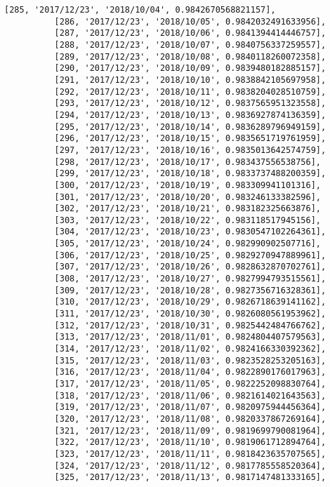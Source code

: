 \documentclass[11pt]{article}
\begin{document}
\begin{Verbatim}[commandchars=\\\{\}]
          [285, '2017/12/23', '2018/10/04', 0.9842670568821157],
          [286, '2017/12/23', '2018/10/05', 0.9842032491633956],
          [287, '2017/12/23', '2018/10/06', 0.9841394414446757],
          [288, '2017/12/23', '2018/10/07', 0.9840756337259557],
          [289, '2017/12/23', '2018/10/08', 0.9840118260072358],
          [290, '2017/12/23', '2018/10/09', 0.9839480182885157],
          [291, '2017/12/23', '2018/10/10', 0.9838842105697958],
          [292, '2017/12/23', '2018/10/11', 0.9838204028510759],
          [293, '2017/12/23', '2018/10/12', 0.9837565951323558],
          [294, '2017/12/23', '2018/10/13', 0.9836927874136359],
          [295, '2017/12/23', '2018/10/14', 0.9836289796949159],
          [296, '2017/12/23', '2018/10/15', 0.9835651719761959],
          [297, '2017/12/23', '2018/10/16', 0.9835013642574759],
          [298, '2017/12/23', '2018/10/17', 0.983437556538756],
          [299, '2017/12/23', '2018/10/18', 0.9833737488200359],
          [300, '2017/12/23', '2018/10/19', 0.983309941101316],
          [301, '2017/12/23', '2018/10/20', 0.983246133382596],
          [302, '2017/12/23', '2018/10/21', 0.983182325663876],
          [303, '2017/12/23', '2018/10/22', 0.983118517945156],
          [304, '2017/12/23', '2018/10/23', 0.9830547102264361],
          [305, '2017/12/23', '2018/10/24', 0.982990902507716],
          [306, '2017/12/23', '2018/10/25', 0.9829270947889961],
          [307, '2017/12/23', '2018/10/26', 0.9828632870702761],
          [308, '2017/12/23', '2018/10/27', 0.9827994793515561],
          [309, '2017/12/23', '2018/10/28', 0.9827356716328361],
          [310, '2017/12/23', '2018/10/29', 0.9826718639141162],
          [311, '2017/12/23', '2018/10/30', 0.9826080561953962],
          [312, '2017/12/23', '2018/10/31', 0.9825442484766762],
          [313, '2017/12/23', '2018/11/01', 0.9824804407579563],
          [314, '2017/12/23', '2018/11/02', 0.9824166330392362],
          [315, '2017/12/23', '2018/11/03', 0.9823528253205163],
          [316, '2017/12/23', '2018/11/04', 0.9822890176017963],
          [317, '2017/12/23', '2018/11/05', 0.9822252098830764],
          [318, '2017/12/23', '2018/11/06', 0.9821614021643563],
          [319, '2017/12/23', '2018/11/07', 0.9820975944456364],
          [320, '2017/12/23', '2018/11/08', 0.9820337867269164],
          [321, '2017/12/23', '2018/11/09', 0.9819699790081964],
          [322, '2017/12/23', '2018/11/10', 0.9819061712894764],
          [323, '2017/12/23', '2018/11/11', 0.9818423635707565],
          [324, '2017/12/23', '2018/11/12', 0.9817785558520364],
          [325, '2017/12/23', '2018/11/13', 0.9817147481333165],

\end{Verbatim}
\end{document}
